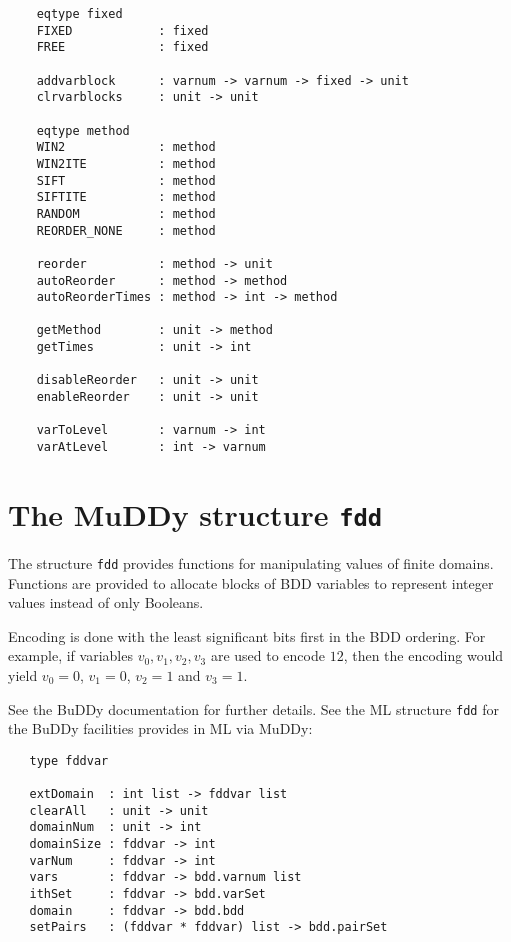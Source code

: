 \documentclass[12pt]{article}
\renewcommand{\t}[1]{\mbox{\tt #1}}
\newcommand{\Buddy}{BuDDy\xspace}
\newcommand{\Muddy}{MuDDy\xspace}
\begin{document}
{\footnotesize\begin{verbatim}
    eqtype fixed
    FIXED            : fixed
    FREE             : fixed

    addvarblock      : varnum -> varnum -> fixed -> unit
    clrvarblocks     : unit -> unit

    eqtype method
    WIN2             : method
    WIN2ITE          : method
    SIFT             : method
    SIFTITE          : method
    RANDOM           : method
    REORDER_NONE     : method

    reorder          : method -> unit
    autoReorder      : method -> method
    autoReorderTimes : method -> int -> method

    getMethod        : unit -> method
    getTimes         : unit -> int

    disableReorder   : unit -> unit
    enableReorder    : unit -> unit

    varToLevel       : varnum -> int
    varAtLevel       : int -> varnum
\end{verbatim}}

\section{The \Muddy{} structure \t{fdd}}\label{fdd}

The structure \t{fdd} provides functions for manipulating values of finite domains.
Functions are provided to allocate blocks of BDD variables to represent integer values instead
of only Booleans.

Encoding is done with the least significant bits first in the BDD ordering. For example, if variables
$v_0, v_1, v_2, v_3$ are used to encode $12$, then the encoding would yield
$v_0=0$, $v_1=0$, $v_2=1$ and $v_3=1$.

See the \Buddy{} documentation \cite{BuDDy} for further details. See the ML structure \t{fdd}
for the \Buddy{} facilities provides in ML via \Muddy:

{\footnotesize\begin{verbatim}
   type fddvar

   extDomain  : int list -> fddvar list
   clearAll   : unit -> unit
   domainNum  : unit -> int
   domainSize : fddvar -> int
   varNum     : fddvar -> int
   vars       : fddvar -> bdd.varnum list
   ithSet     : fddvar -> bdd.varSet
   domain     : fddvar -> bdd.bdd
   setPairs   : (fddvar * fddvar) list -> bdd.pairSet
\end{verbatim}}
\end{document}

